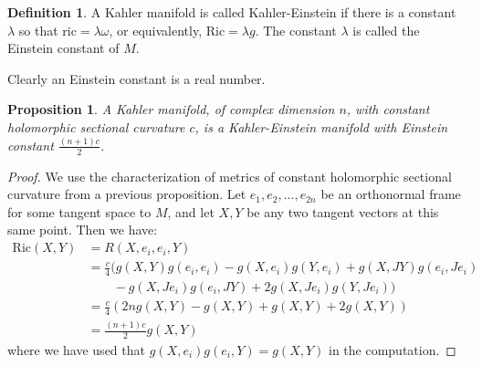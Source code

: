 \documentclass[11pt]{amsart}
\newtheorem{prop}[subsection]{Proposition}
\theoremstyle{definition}
\newtheorem{definition}[subsection]{Definition}
\def \Ric{ \text{Ric} }
\def \ric{ \text{ric} }
\begin{document}
\begin{definition} A Kahler manifold is called Kahler-Einstein if there is a constant $\lambda$ so that $\ric = \lambda \omega$, or equivalently, $\Ric = \lambda g$.  The constant $\lambda $ is called the Einstein constant of $M$.
\end{definition}

Clearly an Einstein constant is a real number.

\begin{prop} A Kahler manifold, of complex dimension $n$, with constant holomorphic sectional curvature $c$, is a Kahler-Einstein manifold with Einstein constant $\frac{(n+1)c}{2}$.
\end{prop}

\begin{proof}
%
We use the characterization of metrics of constant holomorphic sectional curvature from a previous proposition.  Let $e_1, e_2, \ldots, e_{2n}$ be an orthonormal frame for some tangent space to $M$, and let $X, Y$ be any two tangent vectors at this same point.  Then we have:
%
\begin{align*}
\Ric(X,Y) &= R(X, e_i, e_i, Y) \\
&= \frac{c}{4} ( g(X,Y)g(e_i,e_i) - g(X,e_i)g(Y,e_i) + g(X, JY)g(e_i, Je_i) \\
& \qquad - g(X,Je_i)g(e_i,JY) + 2g(X,Je_i)g(Y,Je_i) ) \\
&= \frac{c}{4}( 2n g(X,Y) - g(X,Y) + g(X,Y) + 2g(X,Y) ) \\
&= \frac{ (n+1) c }{2} g(X,Y)
\end{align*}
%
where we have used that $g(X,e_i)g(e_i,Y) = g(X,Y)$ in the computation.
%
\end{proof}
\end{document}
